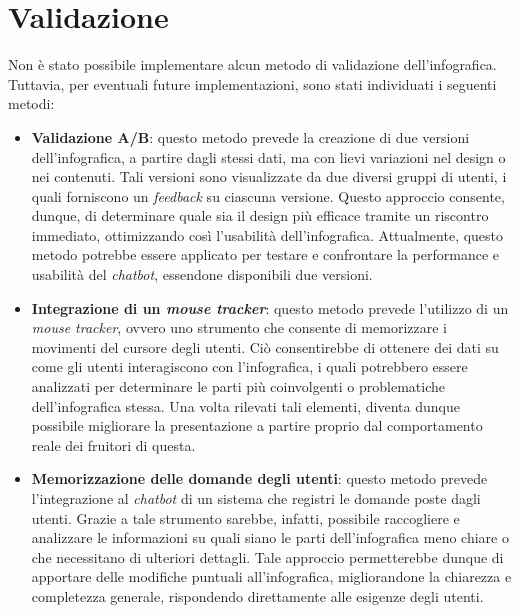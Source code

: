 \section{Validazione}
Non è stato possibile implementare alcun metodo di validazione dell'infografica. Tuttavia, per eventuali future implementazioni, sono stati individuati i seguenti metodi:
\begin{itemize}
    \item \textbf{Validazione A/B}: questo metodo prevede la creazione di due versioni dell'infografica, a partire dagli stessi dati, ma con lievi variazioni nel design o nei contenuti.
    Tali versioni sono visualizzate da due diversi gruppi di utenti, i quali forniscono un \emph{feedback} su ciascuna versione. 
    Questo approccio consente, dunque, di determinare quale sia il design più efficace tramite un riscontro immediato, ottimizzando così l'usabilità dell'infografica. 
    Attualmente, questo metodo potrebbe essere applicato per testare e confrontare la performance e usabilità del \emph{chatbot}, essendone disponibili due versioni.
    \item \textbf{Integrazione di un \emph{mouse tracker}}: questo metodo prevede l'utilizzo di un \emph{mouse tracker}, ovvero uno strumento che consente di memorizzare i movimenti del cursore degli utenti. 
    Ciò consentirebbe di ottenere dei dati su come gli utenti interagiscono con l'infografica, i quali potrebbero essere analizzati per determinare le parti più coinvolgenti o problematiche dell'infografica stessa. 
    Una volta rilevati tali elementi, diventa dunque possibile migliorare la presentazione a partire proprio dal comportamento reale dei fruitori di questa.
    \item \textbf{Memorizzazione delle domande degli utenti}: questo metodo prevede l'integrazione al \emph{chatbot} di un sistema che registri le domande poste dagli utenti.
    Grazie a tale strumento sarebbe, infatti, possibile raccogliere e analizzare le informazioni su quali siano le parti dell'infografica meno chiare o che necessitano di ulteriori dettagli. 
    Tale approccio permetterebbe dunque di apportare delle modifiche puntuali all'infografica, migliorandone la chiarezza e completezza generale, rispondendo direttamente alle esigenze degli utenti.
\end{itemize}
